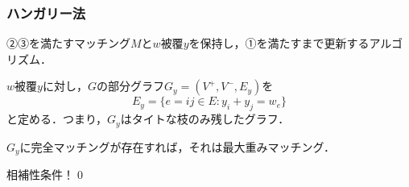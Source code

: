 \documentclass[14pt,aspectratio=169,xcolor=dvipsnames,table,onlytextwidth,dvipdfmx]{beamer}
\begin{document}
\begin{frame}
    \frametitle{ハンガリー法}

    \small
    ②③を満たすマッチング$M$と$w$被覆$y$を保持し，①を満たすまで更新するアルゴリズム．

    \begin{definition}
        $w$被覆$y$に対し，$G$の部分グラフ$G_y = (V^+, V^-, E_y)$を
        \[
            E_y = \{e = ij \in E : y_i + y_j = w_e \} 
        \]
        と定める．つまり，$G_y$はタイトな枝のみ残したグラフ．
    \end{definition}

    \begin{lemma}
        $G_y$に完全マッチングが存在すれば，それは最大重みマッチング．
    \end{lemma}
     相補性条件！\qed

\end{frame}
\end{document}
